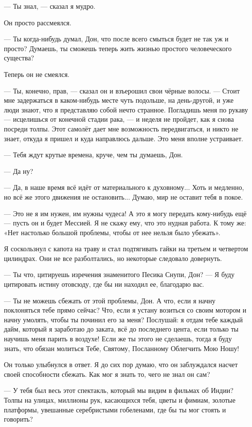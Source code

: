 --- Ты знал, --- сказал я мудро.

Он просто рассмеялся.

--- Ты когда-нибудь думал, Дон, что после всего смыться будет не так уж и просто? Думаешь, ты сможешь теперь жить жизнью простого человеческого существа?

Теперь он не смеялся.

--- Ты, конечно, прав, --- сказал он и взъерошил свои чёрные волосы. --- Стоит мне задержаться в
 ка\-ком-ни\-будь месте чуть подольше, на день-другой, и уже люди знают, что я представляю собой нечто странное. Погладишь меня по рукаву --- исцелишься от конечной стадии рака, --- и неделя не пройдет, как я снова посреди толпы. Этот самолёт дает мне возможность передвигаться, и никто не знает, откуда я пришел и куда направлюсь дальше. Это меня вполне устраивает.

--- Тебя ждут крутые времена, круче, чем ты думаешь, Дон.

--- Да ну?

--- Да, в наше время всё идёт от материального к духовному... Хоть и медленно, но всё же этого
движения не остановить... Думаю, мир не оставит тебя в покое.

--- Это не я им нужен, им нужны чудеса! А это я могу передать кому-нибудь ещё --- пусть он и будет Мессией. Я не скажу ему, что это нудная работа. К тому же: «Нет настолько большой проблемы, чтобы от нее нельзя было убежать».

Я соскользнул с капота на траву и стал подтягивать гайки на третьем и четвертом цилиндрах. Они не все разболтались, но некоторые следовало довернуть.

--- Ты что, цитируешь изречения знаменитого Песика Снупи, Дон?
--- Я буду цитировать истину отовсюду, где бы ни находил ее, благодарю вас.

--- Ты не можешь сбежать от этой проблемы, Дон. А что, если я начну поклоняться тебе прямо сейчас?
Что, если я устану возиться со своим мотором и начну умолять, чтобы ты починил его за меня?
Послушай: я отдам тебе каждый дайм, который я заработаю до заката, всё до последнего цента, если
только ты научишь меня парить в воздухе! Если же ты этого не сделаешь, тогда я буду знать, что
обязан молиться Тебе, Святому, Посланному Облегчить Мою Ношу!

Он только улыбнулся в ответ. Я до сих пор думаю, что он заблуждался насчет своей способности сбежать. Как мог я знать то, чего не знал он сам?

--- У тебя был весь этот спектакль, который мы видим в фильмах об Индии? Толпы на улицах, миллионы рук, касающихся тебя, цветы и фимиам, золотые платформы, увешанные серебристыми гобеленами, где бы ты мог стоять и говорить?

